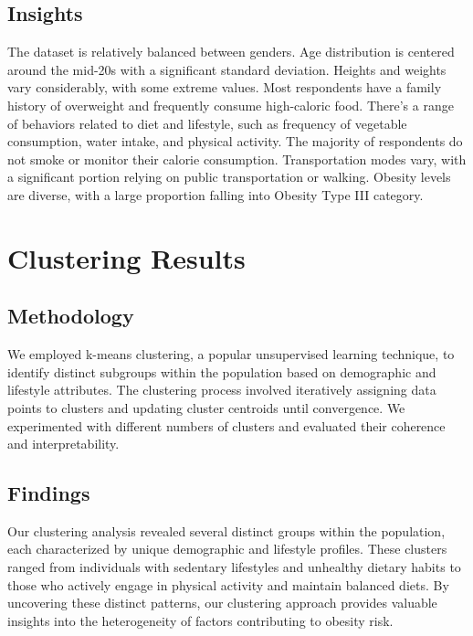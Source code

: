 \documentclass[conference]{IEEEtran}
\begin{document}
\subsection{Insights}\label{AA}
The dataset is relatively balanced between genders.
Age distribution is centered around the mid-20s with a significant standard deviation.
Heights and weights vary considerably, with some extreme values.
Most respondents have a family history of overweight and frequently consume high-caloric food.
There's a range of behaviors related to diet and lifestyle, such as frequency of vegetable consumption, water intake, and physical activity.
The majority of respondents do not smoke or monitor their calorie consumption.
Transportation modes vary, with a significant portion relying on public transportation or walking.
Obesity levels are diverse, with a large proportion falling into Obesity Type III category.




\section{Clustering Results}

\subsection{Methodology}\label{AA}
We employed k-means clustering, a popular unsupervised learning technique, to identify distinct subgroups within the population based on demographic and lifestyle attributes. The clustering process involved iteratively assigning data points to clusters and updating cluster centroids until convergence. We experimented with different numbers of clusters and evaluated their coherence and interpretability.

\subsection{Findings}\label{AA}
Our clustering analysis revealed several distinct groups within the population, each characterized by unique demographic and lifestyle profiles. These clusters ranged from individuals with sedentary lifestyles and unhealthy dietary habits to those who actively engage in physical activity and maintain balanced diets. By uncovering these distinct patterns, our clustering approach provides valuable insights into the heterogeneity of factors contributing to obesity risk.
\end{document}
